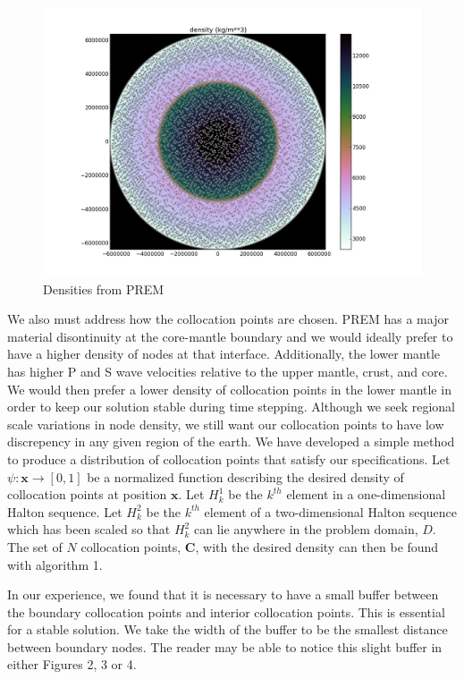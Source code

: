 \documentclass[12pt]{article}
\begin{document}
\begin{figure}[h!]
\includegraphics[scale=0.5]{figures/density}
\centering
\caption{Densities from PREM}

\end{figure}

We also must address how the collocation points are chosen.  PREM has
a major material disontinuity at the core-mantle boundary and we would
ideally prefer to have a higher density of nodes at that interface.
Additionally, the lower mantle has higher P and S wave velocities
relative to the upper mantle, crust, and core.  We would then prefer a
lower density of collocation points in the lower mantle in order to
keep our solution stable during time stepping.  Although we seek
regional scale variations in node density, we still want our
collocation points to have low discrepency in any given region of the
earth.  We have developed a simple method to produce a distribution of
collocation points that satisfy our specifications.  Let
$\psi:\boldsymbol{x}\to [0,1]$ be a normalized function describing the
desired density of collocation points at position $\boldsymbol{x}$.
Let $H^1_k$ be the $k^{th}$ element in a one-dimensional Halton
sequence.  Let $H^2_k$ be the $k^{th}$ element of a two-dimensional
Halton sequence which has been scaled so that $H^2_k$ can lie anywhere
in the problem domain, $D$. The set of $N$ collocation points,
$\boldsymbol{C}$, with the desired density can then be found with algorithm 1.

In our experience, we found that it is necessary to have a small
buffer between the boundary collocation points and interior
collocation points.  This is essential for a stable solution.  We take
the width of the buffer to be the smallest distance between boundary
nodes.  The reader may be able to notice this slight buffer in either
Figures 2, 3 or 4.
\end{document}
